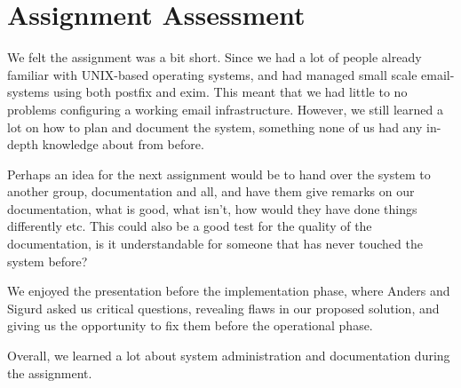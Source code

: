 \section{Assignment Assessment}

We felt the assignment was a bit short. Since we had a lot of people already
familiar with UNIX-based operating systems, and had managed small scale
email-systems using both postfix and exim. This meant that we had little to no
problems configuring a working email infrastructure. However, we still learned a
lot on how to plan and document the system, something none of us had any
in-depth knowledge about from before. 

Perhaps an idea for the next assignment would be to hand over the system to
another group, documentation and all, and have them give remarks on our
documentation, what is good, what isn't, how would they have done things
differently etc. This could also be a good test for the quality of the
documentation, is it understandable for someone that has never touched the
system before? 

We enjoyed the presentation before the implementation phase, where Anders and
Sigurd asked us critical questions, revealing flaws in our proposed solution,
and giving us the opportunity to fix them before the operational phase. 

Overall, we learned a lot about system administration and documentation during
the assignment.
